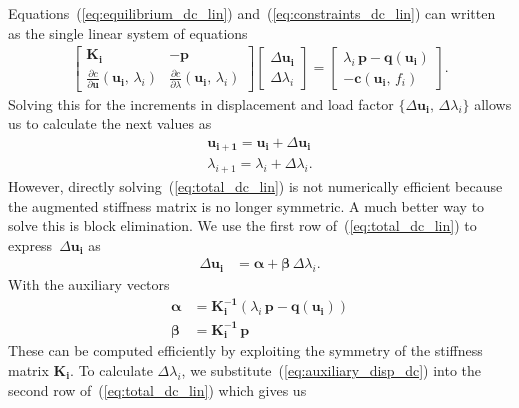 Equations~(\ref{eq:equilibrium_dc_lin}) and~(\ref{eq:constraints_dc_lin}) can written as the single linear system of equations
%
\begin{align}
\begin{bmatrix}
\boldsymbol{K_{i}} & -\boldsymbol{p}\\
\frac{\partial c}{\partial \boldsymbol{u}}(\boldsymbol{u_{i}},\,\lambda_{i}) & \frac{\partial c}{\partial \lambda}(\boldsymbol{u_{i}},\,\lambda_{i})
\end{bmatrix}
\begin{bmatrix}
\Delta\boldsymbol{u_{i}}\\
\Delta \lambda_{i}
\end{bmatrix}
=
\begin{bmatrix}
\lambda_i\,\boldsymbol{p} - \boldsymbol{q}(\boldsymbol{u_{i}})\\
-\boldsymbol{c}(\boldsymbol{u_{i}},\,f_{i})
\end{bmatrix}.\label{eq:total_dc_lin}
\end{align}
%
Solving this for the increments in displacement and load factor $\{\Delta\boldsymbol{u_{i}},\,\Delta \lambda_{i}\}$ allows us to calculate the next values as
%
\begin{align}
\boldsymbol{u_{i+1}} = \boldsymbol{u_{i}} + \Delta\boldsymbol{u_{i}}\\
\lambda_{i+1} = \lambda_{i} + \Delta \lambda_{i}.
\end{align}
%
However, directly solving~(\ref{eq:total_dc_lin}) is not  numerically efficient because the augmented stiffness matrix is no longer symmetric. A much better way to solve this is block elimination. We use the first row of~(\ref{eq:total_dc_lin}) to express~$\Delta\boldsymbol{u_{i}}$ as
%
\begin{align}
\Delta\boldsymbol{u_{i}} &= \boldsymbol{\alpha} + \boldsymbol{\beta}\,\Delta \lambda_{i}.\label{eq:auxiliary_disp_dc}
\end{align}
%
With the auxiliary vectors
%
\begin{align}
\boldsymbol{\alpha} &= \boldsymbol{K_{i}^{-1}}(\lambda_i\,\boldsymbol{p} - \boldsymbol{q}(\boldsymbol{u_{i}}))\label{eq:auxiliary_1}\\
\boldsymbol{\beta} &= \boldsymbol{K_{i}^{-1}}\,\boldsymbol{p}\label{eq:auxiliary_2}
\end{align}
%
These can be computed efficiently by exploiting the symmetry of the stiffness matrix $\boldsymbol{K_{i}}$.
%
To calculate $\Delta \lambda_i$, we substitute~(\ref{eq:auxiliary_disp_dc}) into the second row of~(\ref{eq:total_dc_lin}) which gives us
